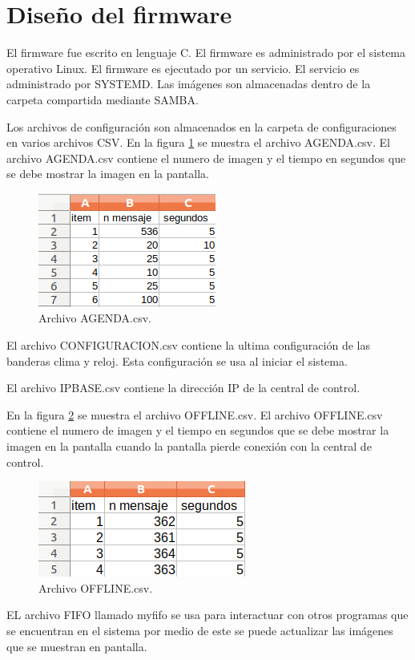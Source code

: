 \section{ Diseño del firmware}
El firmware fue escrito en lenguaje C. El firmware es administrado por el sistema operativo Linux. El firmware es ejecutado por un servicio. El servicio es administrado por SYSTEMD. Las imágenes son almacenadas  dentro de la carpeta compartida mediante SAMBA. 

Los archivos de configuración son almacenados en la carpeta de configuraciones en varios archivos CSV. En la figura \ref{fig:agendacsv} se muestra el archivo AGENDA.csv. El archivo AGENDA.csv contiene el numero de imagen y el tiempo en segundos que se debe mostrar la imagen en la pantalla.

\begin{figure}[htpb]
	\centering
    \includegraphics[scale=1]{Figures/Agenda.png} 
	\caption{Archivo AGENDA.csv.}
	\label{fig:agendacsv}
\end{figure}


El archivo CONFIGURACION.csv contiene la ultima configuración de las banderas clima y reloj. Esta configuración se usa al iniciar el sistema.

El archivo IPBASE.csv contiene la dirección IP de la central de control.

En la figura \ref{fig:offlinecsv} se muestra el archivo OFFLINE.csv. El archivo OFFLINE.csv contiene el numero de imagen y el tiempo en segundos que se debe mostrar la imagen en la pantalla cuando la pantalla pierde conexión con la central de control.

\begin{figure}[htpb]
	\centering
	\includegraphics[scale=1]{Figures/offline.png} 
	\caption{Archivo OFFLINE.csv.}
	\label{fig:offlinecsv}
\end{figure}
EL archivo FIFO llamado myfifo se usa para interactuar con otros programas que se encuentran en el sistema por medio de este se puede actualizar las imágenes que se muestran en pantalla.


